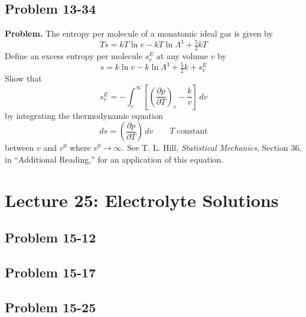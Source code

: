\documentclass[twocolumn, 10pt]{article}
\numberwithin{equation}{section}
\newenvironment{problem}
{\par\medskip \color{problue}
  \textbf{Problem. }\ignorespaces}
{\medskip}
\begin{document}
\subsection{Problem 13-34}

\begin{problem}
  The entropy per molecule of a monatomic ideal gas is given by
  $$
  Ts = kT\ln v - kT \ln\Lambda^3 + \tfrac{5}{2}kT
  $$
  Define an excess entropy per molecule $s_v^E$ at any volume $v$ by
  $$
  s = k \ln v - k \ln \Lambda^3 + \tfrac{5}{2}k + s_v^E
  $$
  Show that
  $$
  s_v^E = - \int_v^\infty \left[
    \left( \frac{ \partial p } { \partial T }
    \right)_v - \frac{k}{v} \right] \, dv
  $$
  by integrating the thermodynamic equation
  $$
  ds = \left(\frac{\partial p}{\partial T} \right) \, dv
  \qquad T \mathrm{\; constant}
  $$
  between $v$ and $v^0$ where $v^0 \to \infty$.
  See T. L. Hill, \textit{Statistical Mechanics},
  Section 36, in ``Additional Reading,''
  for an application of this equation.
\end{problem}

\section{Lecture 25: Electrolyte Solutions}

\subsection{Problem 15-12}

\subsection{Problem 15-17}

\subsection{Problem 15-25}
\end{document}
